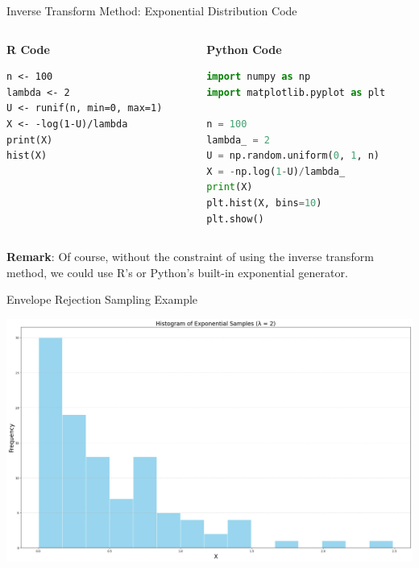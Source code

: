 \documentclass[8pt]{beamer}
\begin{document}
\begin{frame}[fragile]{Inverse Transform Method: Exponential Distribution}
\alert{Code}

\vspace{2mm}

\begin{columns}[T]

\begin{column}{0.4\textwidth}
\textbf{R Code}
\begin{lstlisting}
n <- 100
lambda <- 2
U <- runif(n, min=0, max=1)
X <- -log(1-U)/lambda
print(X)
hist(X)
\end{lstlisting}
\end{column}

\begin{column}{0.45\textwidth}
\textbf{Python Code}
\begin{lstlisting}[language=Python]
import numpy as np
import matplotlib.pyplot as plt

n = 100
lambda_ = 2
U = np.random.uniform(0, 1, n)
X = -np.log(1-U)/lambda_
print(X)
plt.hist(X, bins=10)
plt.show()
\end{lstlisting}
\end{column}
\end{columns}

\pause

\textbf{Remark}: Of course, without the constraint of using the inverse transform method, we could use R's or Python's built-in exponential generator.
\end{frame}

\begin{frame}[fragile]{Envelope Rejection Sampling Example}
\begin{center}
\includegraphics[width=\textwidth]{chapter1-part2-plot1.png}
\end{center}
\end{frame}
\end{document}

